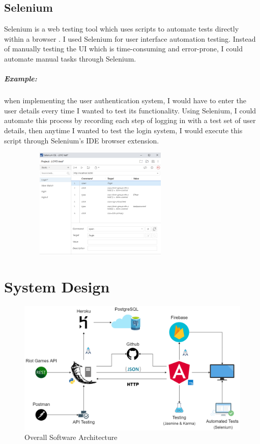 \section{Selenium}
Selenium is a web testing tool which uses scripts to automate tests directly within a browser \cite{holmes2006automating}. I used Selenium for user interface automation testing. Instead of manually testing the UI which is time-consuming and error-prone, I could automate manual tasks through Selenium.

\paragraph{Example:}when implementing the user authentication system, I would have to enter the user details every time I wanted to test its functionality. Using Selenium, I could automate this process by recording each step of logging in with a test set of user details, then anytime I wanted to test the login system, I would execute this script through Selenium's IDE browser extension.
\begin{center}
\includegraphics[width=10cm,height=5.3cm,keepaspectratio]{img/Selenium.png}
\end{center}


\chapter{System Design}

\begin{figure}[H]	  
	\includegraphics[width=\textwidth,height=\textheight,keepaspectratio]{img/Architecture.png}
	\caption{Overall Software Architecture}
	\label{tikz:arch}
\end{figure}

